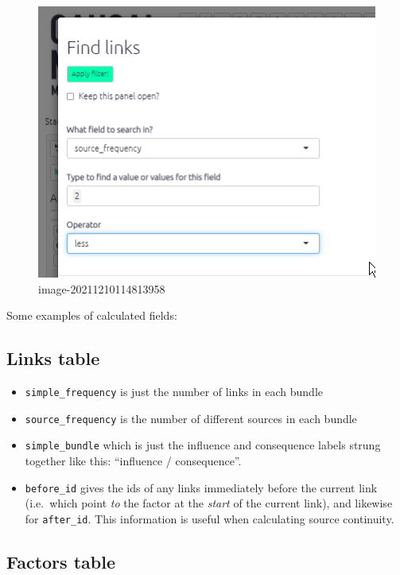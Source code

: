 \documentclass[
]{book}
\providecommand{\tightlist}{%
  \setlength{\itemsep}{0pt}\setlength{\parskip}{0pt}}
\begin{document}
\begin{figure}
\centering
\includegraphics[width=6.77083in,height=\textheight]{_assets/image-20211210114813958.png}
\caption{image-20211210114813958}
\end{figure}

Some examples of calculated fields:

\hypertarget{links-table}{%
\subsection{Links table}\label{links-table}}

\begin{itemize}
\tightlist
\item
  \texttt{simple\_frequency} is just the number of links in each bundle
\item
  \texttt{source\_frequency} is the number of different sources in each bundle
\item
  \texttt{simple\_bundle} which is just the influence and consequence labels strung together like this: ``influence / consequence''.
\item
  \texttt{before\_id} gives the ids of any links immediately before the current link (i.e.~which point \emph{to} the factor at the \emph{start} of the current link), and likewise for \texttt{after\_id}. This information is useful when calculating source continuity.
\end{itemize}

\hypertarget{factors-table}{%
\subsection{Factors table}\label{factors-table}}
\end{document}
